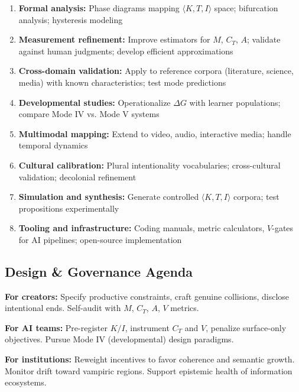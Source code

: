 \documentclass[12pt]{article}
\begin{document}
\begin{enumerate}
\item \textbf{Formal analysis:} Phase diagrams mapping $\langle K, T, I \rangle$ space; bifurcation analysis; hysteresis modeling

\item \textbf{Measurement refinement:} Improve estimators for $M$, $C_T$, $A$; validate against human judgments; develop efficient approximations

\item \textbf{Cross-domain validation:} Apply to reference corpora (literature, science, media) with known characteristics; test mode predictions

\item \textbf{Developmental studies:} Operationalize $\Delta G$ with learner populations; compare Mode IV vs. Mode V systems

\item \textbf{Multimodal mapping:} Extend to video, audio, interactive media; handle temporal dynamics

\item \textbf{Cultural calibration:} Plural intentionality vocabularies; cross-cultural validation; decolonial refinement

\item \textbf{Simulation and synthesis:} Generate controlled $\langle K, T, I \rangle$ corpora; test propositions experimentally

\item \textbf{Tooling and infrastructure:} Coding manuals, metric calculators, $V$-gates for AI pipelines; open-source implementation
\end{enumerate}

\subsection{Design \& Governance Agenda}

\textbf{For creators:} Specify productive constraints, craft genuine collisions, disclose intentional ends. Self-audit with $M$, $C_T$, $A$, $V$ metrics.

\textbf{For AI teams:} Pre-register $K/I$, instrument $C_T$ and $V$, penalize surface-only objectives. Pursue Mode IV (developmental) design paradigms.

\textbf{For institutions:} Reweight incentives to favor coherence and semantic growth. Monitor drift toward vampiric regions. Support epistemic health of information ecosystems.
\end{document}
